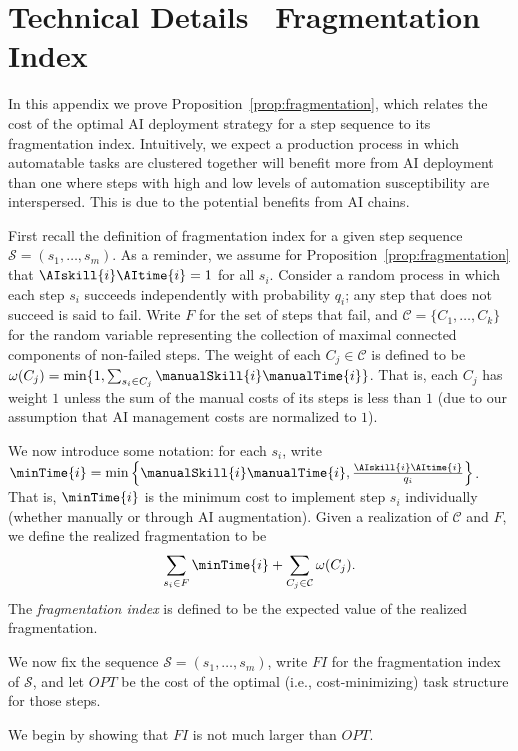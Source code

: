 \section{Technical Details \textendash \ Fragmentation Index}
\label{app:FI}

In this appendix we prove Proposition~\ref{prop:fragmentation}, which relates the cost of the optimal AI deployment strategy for a step sequence to its fragmentation index.
Intuitively, we expect a production process in which automatable tasks are clustered together will benefit more from AI deployment than one where steps with high and low levels of automation susceptibility are interspersed.  
This is due to the potential benefits from AI chains.

First recall the definition of fragmentation index for a given step sequence $\mathcal{S} = (s_1, \dotsc, s_m)$.  
As a reminder, we assume for Proposition~\ref{prop:fragmentation} that $\AIskill{i}\AItime{i} = 1$ for all $s_i$.  
Consider a random process in which each step $s_i$ succeeds independently with probability $q_i$; any step that does not succeed is said to fail.  
Write $F$ for the set of steps that fail, and $\mathcal{C} = \{C_1, \dotsc, C_k\}$ for the random variable representing the collection of maximal connected components of non-failed steps.  
The weight of each $C_j \in \mathcal{C}$ is defined to be $\omega(C_j) = \min\{ 1, \sum_{s_i \in C_j} \manualSkill{i}\manualTime{i} \}$.  
That is, each $C_j$ has weight $1$ unless the sum of the manual costs of its steps is less than $1$ (due to our assumption that AI management costs are normalized to $1$).

We now introduce some notation: for each $s_i$, write $\minTime{i} = \min\left\{\manualSkill{i}\manualTime{i}, \frac{\AIskill{i}\AItime{i}}{q_i}\right\}$.  That is, $\minTime{i}$ is the minimum cost to implement step $s_i$ individually (whether manually or through AI augmentation).  
Given a realization of $\mathcal{C}$ and $F$, we define the realized fragmentation to be 
\[ \sum_{s_i \in F}\minTime{i} + \sum_{C_j \in \mathcal{C}} \omega(C_j).\]
The \emph{fragmentation index} is defined to be the expected value of the realized fragmentation.

We now fix the sequence $\mathcal{S} = (s_1, \dotsc, s_m)$, write $FI$ for the fragmentation index of $\mathcal{S}$, and let $OPT$ be the cost of the optimal (i.e., cost-minimizing) task structure for those steps.

We begin by showing that $FI$ is not much larger than $OPT$.


